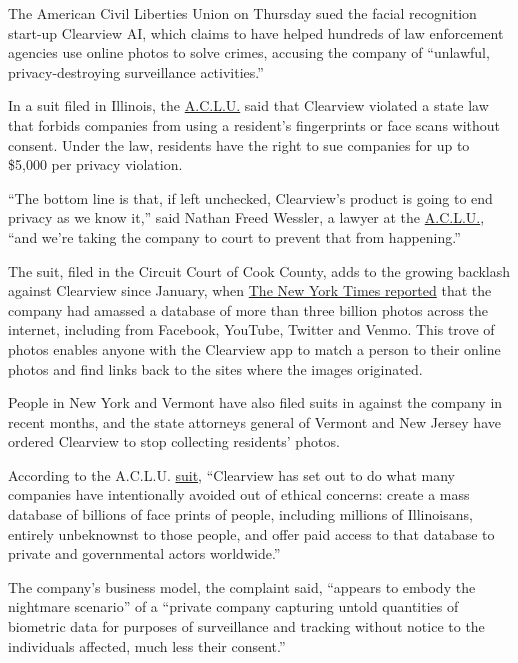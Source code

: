 The American Civil Liberties Union on Thursday sued the facial
recognition start-up Clearview AI, which claims to have helped hundreds
of law enforcement agencies use online photos to solve crimes, accusing
the company of ``unlawful, privacy-destroying surveillance activities.''

In a suit filed in Illinois, the
\href{https://www.nytimes.com/2020/06/03/business/aclu-sues-police-minneapolis.html}{A.C.L.U.}
said that Clearview violated a state law that forbids companies from
using a resident's fingerprints or face scans without consent. Under the
law, residents have the right to sue companies for up to \$5,000 per
privacy violation.

``The bottom line is that, if left unchecked, Clearview's product is
going to end privacy as we know it,'' said Nathan Freed Wessler, a
lawyer at the
\href{https://www.nytimes.com/2020/06/03/business/aclu-sues-police-minneapolis.html}{A.C.L.U.},
``and we're taking the company to court to prevent that from
happening.''

The suit, filed in the Circuit Court of Cook County, adds to the growing
backlash against Clearview since January, when
\href{https://www.nytimes.com/2020/01/18/technology/clearview-privacy-facial-recognition.html}{The
New York Times reported} that the company had amassed a database of more
than three billion photos across the internet, including from Facebook,
YouTube, Twitter and Venmo. This trove of photos enables anyone with the
Clearview app to match a person to their online photos and find links
back to the sites where the images originated.

People in New York and Vermont have also filed suits in against the
company in recent months, and the state attorneys general of Vermont and
New Jersey have ordered Clearview to stop collecting residents' photos.

According to the A.C.L.U.
\href{https://www.aclu.org/legal-document/aclu-v-clearview-ai-complaint}{suit},
``Clearview has set out to do what many companies have intentionally
avoided out of ethical concerns: create a mass database of billions of
face prints of people, including millions of Illinoisans, entirely
unbeknownst to those people, and offer paid access to that database to
private and governmental actors worldwide.''

The company's business model, the complaint said, ``appears to embody
the nightmare scenario'' of a ``private company capturing untold
quantities of biometric data for purposes of surveillance and tracking
without notice to the individuals affected, much less their consent.''

